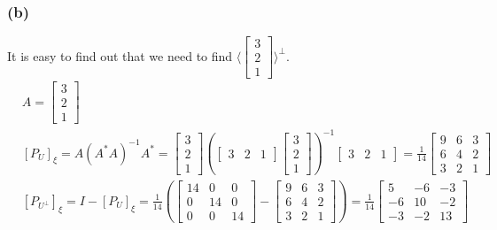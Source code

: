 \documentclass{article}
\begin{document}
\subsubsection*{(b)}
It is easy to find out that we need to find $\langle \begin {bmatrix}
    3 \\ 2 \\ 1
\end{bmatrix}\rangle ^ {\bot}$. 
\begin{equation*}
    \begin{split}
        &A = \begin{bmatrix}
            3 \\
            2 \\
            1 
        \end{bmatrix}\\
        &[P_U]_\xi = A(A^*A)^{-1}A^* = \begin{bmatrix}
            3 \\
            2 \\
            1  
        \end{bmatrix} (\begin{bmatrix}
            3 & 2 & 1 
        \end{bmatrix} \begin{bmatrix}
            3 \\
            2 \\
            1 
        \end{bmatrix})^{-1} \begin{bmatrix}
            3 & 2 & 1 
        \end{bmatrix} = \frac{1}{14}\begin{bmatrix}
                9 & 6 & 3 \\
                6 & 4 & 2 \\
                3 & 2 & 1
        \end{bmatrix} \\
        & [P_{U^{\bot}}]_\xi = I - [P_U]_\xi = \frac{1}{14}(\begin{bmatrix}
            14 & 0 & 0 \\
            0 & 14 & 0 \\
            0 & 0 & 14 
    \end{bmatrix} - \begin{bmatrix}
        9 & 6 & 3 \\
        6 & 4 & 2 \\
        3 & 2 & 1
        \end{bmatrix}) = \frac{1}{14} \begin{bmatrix}
            5 & -6 & -3 \\
            -6 & 10 & -2 \\
            -3 & -2 & 13
    \end{bmatrix}
    \end{split}
\end{equation*}
\end{document}
